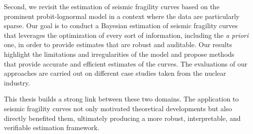 {%
Second, we revisit the estimation of seismic fragility curves based on the prominent probit-lognormal model in a context where the data are particularly sparse.
Our goal is to conduct a Bayesian estimation of seismic fragility curves that leverages the optimization of every sort of information, including the \emph{a priori} one, in order to provide estimates that are robust and auditable.
Our results highlight the limitations and irregularities of the model and propose methods that provide accurate and efficient estimates of the curves. The evaluations of our approaches are carried out on different case studies taken from the nuclear industry.


This thesis builds a strong link between these two domains.
The application to seismic fragility curves not only motivated theoretical developments but also directly benefited them, ultimately producing a more robust, interpretable, and verifiable estimation framework.
}





